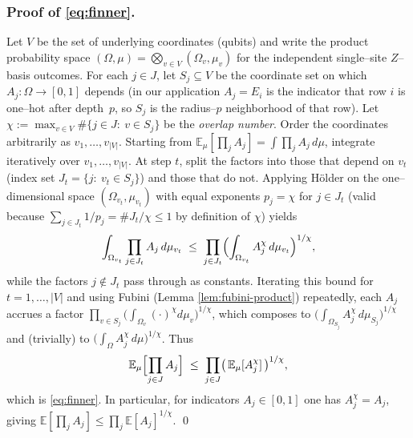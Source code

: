 \documentclass[a4paper,onecolumn,11pt,unpublished]{quantumarticle}
\theoremstyle{remark}
\begin{document}
\subsubsection*{Proof of \eqref{eq:finner}.}
Let $V$ be the set of underlying coordinates (qubits) and write the product
probability space $(\Omega,\mu)=\bigotimes_{v\in V}(\Omega_v,\mu_v)$ for the
independent single–site $Z$–basis outcomes. For each $j\in J$, let $S_j\subseteq V$
be the coordinate set on which $A_j:\Omega\to[0,1]$ depends (in our application
$A_j=E_i$ is the indicator that row $i$ is one–hot after depth~$p$, so $S_j$ is
the radius–$p$ neighborhood of that row). Let
$\chi:=\max_{v\in V}\#\{j\in J:\ v\in S_j\}$ be the \emph{overlap number}.
Order the coordinates arbitrarily as $v_1,\dots,v_{|V|}$. Starting from
$\mathbb{E}_\mu[\prod_{j}A_j]=\int \prod_{j}A_j\,d\mu$, integrate iteratively
over $v_1,\dots,v_{|V|}$. At step $t$, split the factors into those that
depend on $v_t$ (index set $J_t=\{j:\ v_t\in S_j\}$) and those that do not.
Applying Hölder on the one–dimensional space $(\Omega_{v_t},\mu_{v_t})$ with
equal exponents $p_j=\chi$ for $j\in J_t$ (valid because
$\sum_{j\in J_t}1/p_j=\#J_t/\chi\le 1$ by definition of $\chi$) yields
\[
\int_{\Omega_{v_t}}\prod_{j\in J_t} A_j\,d\mu_{v_t}
\;\le\;\prod_{j\in J_t}\Bigl(\int_{\Omega_{v_t}} A_j^{\chi}\,d\mu_{v_t}\Bigr)^{1/\chi},
\]
while the factors $j\notin J_t$ pass through as constants. Iterating this bound
for $t=1,\dots,|V|$ and using Fubini (Lemma \ref{lem:fubini-product}) repeatedly, each $A_j$ accrues a factor
$\prod_{v\in S_j}\bigl(\int_{\Omega_v}(\cdot)^{\chi}d\mu_v\bigr)^{1/\chi}$,
which composes to $\bigl(\int_{\Omega_{S_j}} A_j^{\chi}\,d\mu_{S_j}\bigr)^{1/\chi}$
and (trivially) to $\bigl(\int_{\Omega} A_j^{\chi}\,d\mu\bigr)^{1/\chi}$. Thus
\[
\mathbb{E}_\mu\Bigl[\prod_{j\in J}A_j\Bigr]
\;\le\;\prod_{j\in J}\bigl(\,\mathbb{E}_\mu[A_j^{\chi}]\,\bigr)^{1/\chi},
\]
which is \eqref{eq:finner}. In particular, for indicators $A_j\in[0,1]$ one has
$A_j^{\chi}=A_j$, giving $\mathbb{E}[\prod_j A_j]\le \prod_j \mathbb{E}[A_j]^{1/\chi}$.
\qed
\end{document}

